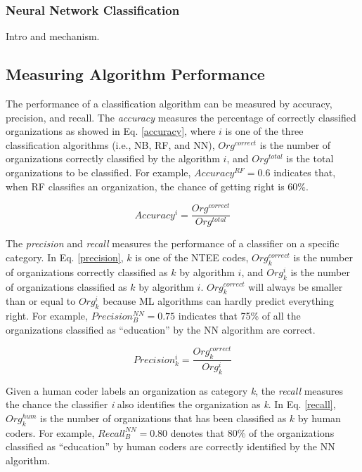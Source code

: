 \documentclass[12pt]{article}
\begin{document}
\subsubsection{Neural Network Classification}

Intro and mechanism.

\subsection{Measuring Algorithm Performance}

The performance of a classification algorithm can be measured by {accuracy}, {precision}, and {recall}. The \textit{accuracy} measures the percentage of correctly classified organizations as showed in Eq. \ref{accuracy}, where $i$ is one of the three classification algorithms (i.e., NB, RF, and NN), $Org^{correct}$ is the number of organizations correctly classified by the algorithm $i$, and $Org^{total}$ is the total organizations to be classified. For example, $Accuracy^{RF}=0.6$ indicates that, when RF classifies an organization, the chance of getting right is 60\%.

\begin{equation} \label{accuracy}
    Accuracy^i=\frac{Org^{correct}}{Org^{total}}
\end{equation}

The \textit{precision} and \textit{recall} measures the performance of a classifier on a specific category. In Eq. \ref{precision}, $k$ is one of the NTEE codes, $Org^{correct}_{k}$ is the number of organizations correctly classified as $k$ by algorithm $i$, and ${Org^{i}_{k}}$ is the number of organizations classified as $k$ by algorithm $i$. $Org^{correct}_{k}$ will always be smaller than or equal to ${Org^{i}_{k}}$ because ML algorithms can hardly predict everything right. For example, $Precision^{NN}_{B}=0.75$ indicates that 75\% of all the organizations classified as ``education'' by the NN algorithm are correct.

\begin{equation} \label{precision}
    Precision^{i}_{k}=\frac{Org^{correct}_{k}}{Org^{i}_{k}}
\end{equation}

Given a human coder labels an organization as category \textit{k}, the \textit{recall} measures the chance the classifier \textit{i} also identifies the organization as \textit{k}. In Eq. \ref{recall}, $Org^{hum}_{k}$ is the number of organizations that has been classified as $k$ by human coders. For example, $Recall^{NN}_{B}=0.80$ denotes that 80\% of the organizations classified as ``education'' by human coders are correctly identified by the NN algorithm.
\end{document}
